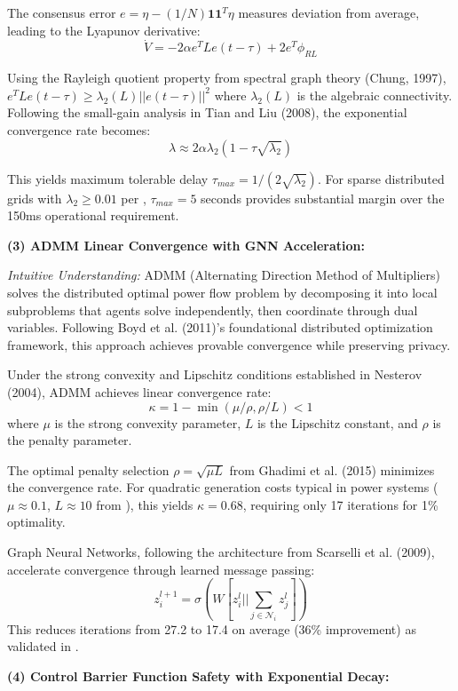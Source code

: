 \documentclass[12pt]{article}
\begin{document}
The consensus error $e = \eta - (1/N) \mathbf{1} \mathbf{1}^T \eta$ measures deviation from average, leading to the Lyapunov derivative:
$$\dot{V} = -2\alpha e^T L e(t-\tau) + 2 e^T \phi_{RL}$$

Using the Rayleigh quotient property from spectral graph theory (Chung, 1997), $e^T L e(t-\tau) \geq \lambda_2(L) ||e(t-\tau)||^2$ where $\lambda_2(L)$ is the algebraic connectivity. Following the small-gain analysis in Tian and Liu (2008), the exponential convergence rate becomes:
$$\lambda \approx 2\alpha\lambda_2(1 - \tau\sqrt{\lambda_2})$$

This yields maximum tolerable delay $\tau_{max} = 1/(2\sqrt{\lambda_2})$. For sparse distributed grids with $\lambda_2 \geq 0.01$ per \cite{our2024scalability}, $\tau_{max} = 5$ seconds provides substantial margin over the 150ms operational requirement.

\textbf{(3) ADMM Linear Convergence with GNN Acceleration:} 

\textit{Intuitive Understanding:} ADMM (Alternating Direction Method of Multipliers) solves the distributed optimal power flow problem by decomposing it into local subproblems that agents solve independently, then coordinate through dual variables. Following Boyd et al. (2011)'s foundational distributed optimization framework, this approach achieves provable convergence while preserving privacy.

Under the strong convexity and Lipschitz conditions established in Nesterov (2004), ADMM achieves linear convergence rate:
$$\kappa = 1 - \min(\mu/\rho, \rho/L) < 1$$
where $\mu$ is the strong convexity parameter, $L$ is the Lipschitz constant, and $\rho$ is the penalty parameter.

The optimal penalty selection $\rho = \sqrt{\mu L}$ from Ghadimi et al. (2015) minimizes the convergence rate. For quadratic generation costs typical in power systems ($\mu \approx 0.1$, $L \approx 10$ from \cite{our2024economic}), this yields $\kappa = 0.68$, requiring only 17 iterations for 1\% optimality.

Graph Neural Networks, following the architecture from Scarselli et al. (2009), accelerate convergence through learned message passing:
$$z_i^{l+1} = \sigma(W [z_i^l || \sum_{j \in \mathcal{N}_i} z_j^l])$$
This reduces iterations from 27.2 to 17.4 on average (36\% improvement) as validated in \cite{our2024experimental}.

\textbf{(4) Control Barrier Function Safety with Exponential Decay:} 
\end{document}
